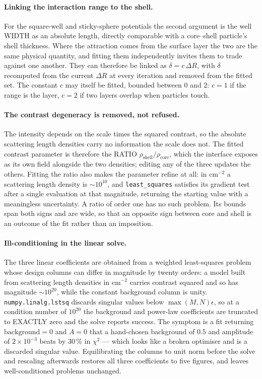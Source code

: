 \documentclass[11pt,a4paper]{article}
\newcommand{\code}[1]{\texttt{\hspace{0pt}#1}}
\begin{document}
\paragraph{Linking the interaction range to the shell.} For the square-well
and sticky-sphere potentials the second argument is the well WIDTH as an
absolute length, directly comparable with a core--shell particle's shell
thickness. Where the attraction comes from the surface layer the two are the
same physical quantity, and fitting them independently invites them to trade
against one another. They can therefore be linked as $\delta = c\,\Delta R$,
with $\delta$ recomputed from the current $\Delta R$ at every iteration and
removed from the fitted set. The constant $c$ may itself be fitted, bounded
between $0$ and $2$: $c=1$ if the range is the layer, $c=2$ if two layers
overlap when particles touch.

\paragraph{The contrast degeneracy is removed, not refused.} The intensity
depends on
the scale times the squared contrast, so the absolute scattering length
densities carry no information the scale does not. The fitted contrast
parameter is therefore the RATIO $\rho_{\mathrm{shell}}/\rho_{\mathrm{core}}$,
which the interface exposes as its own field alongside the two densities;
editing any of the three updates the others. Fitting the ratio also makes
the parameter refine at all: in $\mathrm{cm}^{-2}$ a scattering length
density is $\sim10^{10}$, and \code{least\_squares} satisfies its gradient
test after a single evaluation at that magnitude, returning the starting
value with a meaningless uncertainty. A ratio of order one has no such
problem. Its bounds span both signs and are wide, so that an opposite sign
between core and shell is an outcome of the fit rather than an imposition.

\paragraph{Ill-conditioning in the linear solve.} The three linear
coefficients are obtained from a weighted least-squares problem whose design
columns can differ in magnitude by twenty orders: a model built from
scattering length densities in $\mathrm{cm}^{-2}$ carries contrast squared
and so has magnitude $\sim10^{20}$, while the constant background column is
unity. \code{numpy.linalg.lstsq} discards singular values below
$\max(M,N)\epsilon$, so at a condition number of $10^{20}$ the background and
power-law coefficients are truncated to EXACTLY zero and the solve reports
success. The symptom is a fit returning $\mathrm{background} = 0$ and
$A = 0$ that a hand-chosen background of $0.5$ and amplitude of
$2\times10^{-3}$ beats by $30\,\%$ in $\chi^2$ --- which looks like a broken
optimiser and is a discarded singular value. Equilibrating the columns to
unit norm before the solve and rescaling afterwards restores all three
coefficients to five figures, and leaves well-conditioned problems
unchanged.
\end{document}
